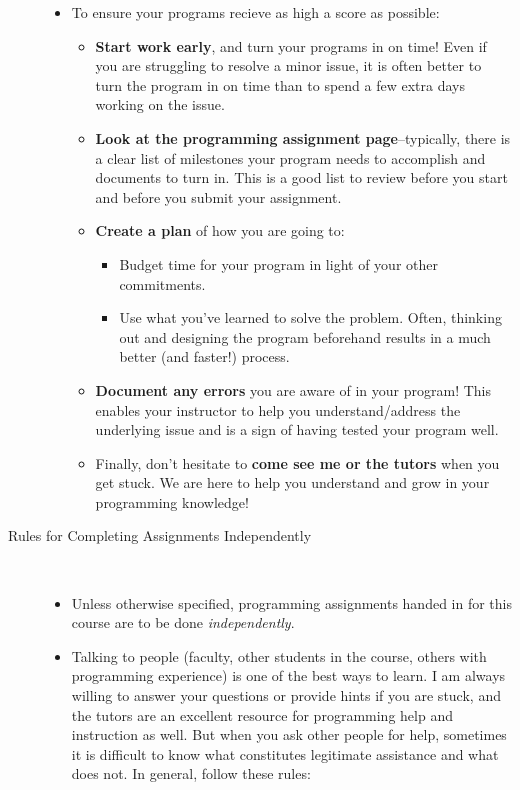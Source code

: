 \documentclass [letterpaper,11pt]{article}
\begin{document}
\begin{description}
\begin{itemize}
\item To ensure your programs recieve as high a score as possible:
	\begin{itemize}
	\item  \textbf{Start work early}, and turn your programs in on time!  Even if you are struggling to resolve a minor issue, it is often better to turn the program in on time than to spend a few extra days working on the issue.
	\item 	\textbf{Look at the programming assignment page}--typically, there is a clear list of milestones your program needs to accomplish and documents to turn in.  This is a good list to review before you start and before you submit your assignment.
	\item  \textbf{Create a plan} of how you are going to:
\begin{itemize}
\item Budget time for your program in light of your other commitments.
\item Use what you've learned to solve the problem.  Often, thinking out and designing the program beforehand results in a much better (and faster!) process.
\end{itemize}
	\item	\textbf{Document any errors} you are aware of in your program!  This enables your instructor to help you understand/address the underlying issue and is a sign of having tested your program well.
\item 	Finally, don't hesitate to \textbf{come see me or the tutors} when you get stuck.  We are here to help you understand and grow in your programming knowledge!
\end{itemize}
\end{itemize}

\pagebreak

\item[Rules for Completing Assignments Independently]\
\begin{itemize}
        \item Unless otherwise specified, programming assignments handed in for this course are to be done \emph{independently}.  
        \item Talking to people (faculty, other students in the course, others with programming experience) is one of the best ways to learn.  I am always willing to answer your questions or provide hints if you are stuck, and the tutors are an excellent resource for programming help and instruction as well.  But when you ask other people for help, sometimes
        it is difficult to know what constitutes legitimate assistance and what does not.  In general, follow these rules:
        

\end{itemize}
\end{description}
\end{document}
